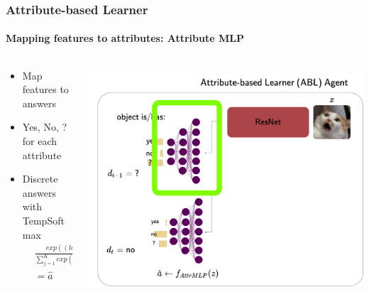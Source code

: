 \documentclass[9pt]{beamer}
\begin{document}
\begin{frame}
\frametitle{Attribute-based Learner}
\framesubtitle{Mapping features to attributes: Attribute MLP}
\begin{columns}[T]
\begin{column}{.5\textwidth}
	\begin{itemize}
		\item Map features to answers
		\item Yes, No, ? for each attribute
		\item Discrete answers with TempSoftmax
		\begin{align*}
		&\frac{exp((log\;\pi_i)/\tau)}{\sum_{j=1}^{K}exp((log\;\pi_j)/\tau)}\\
		& = \hat{a}
		\end{align*}
	\end{itemize}
\end{column}
\begin{column}{.5\textwidth}
	\includegraphics[width=\textwidth]{images/urdtc_parts_attrMLP.pdf}
\end{column}
\end{columns}
\end{frame}
\end{document}
